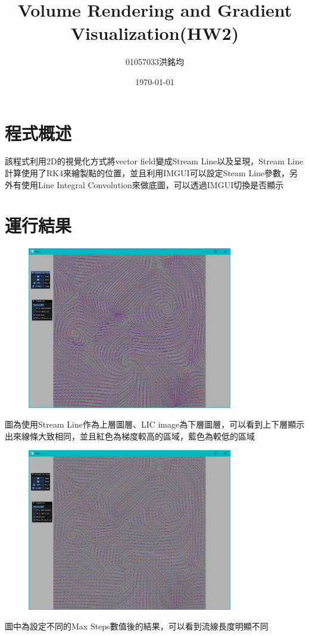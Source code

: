 \documentclass[a4paper,12pt]{article}
\title{Volume Rendering and Gradient Visualization(HW2)}
\author{01057033洪銘均}
\date{\today}
\begin{document}
\maketitle
\tableofcontents
\newpage

\section{程式概述}
該程式利用2D的視覺化方式將vector field變成Stream Line以及呈現，Stream Line計算使用了RK4來繪製點的位置，並且利用IMGUI可以設定Steam Line參數，另外有使用Line Integral Convolution來做底圖，可以透過IMGUI切換是否顯示


\section{運行結果}

\begin{figure}[h]
    \centering
    \includegraphics[width=0.8\textwidth]{img/img0.png}
\end{figure}
圖為使用Stream Line作為上層圖層、LIC image為下層圖層，可以看到上下層顯示出來線條大致相同，並且紅色為梯度較高的區域，藍色為較低的區域

\begin{figure}[h]
    \centering
    \includegraphics[width=0.8\textwidth]{img/img1.png}
\end{figure}
圖中為設定不同的Max Steps數值後的結果，可以看到流線長度明顯不同
\end{document}
